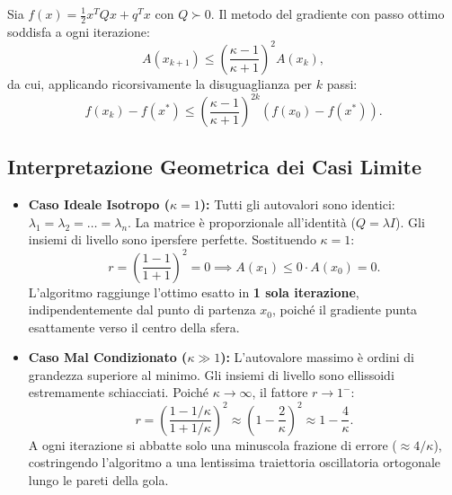 \begin{theorem}
Sia $f(x) = \frac{1}{2} x^T Q x + q^T x$ con $Q \succ 0$. Il metodo del gradiente con passo ottimo soddisfa a ogni iterazione:
\begin{equation}
    A(x_{k+1}) \le \left( \frac{\kappa - 1}{\kappa + 1} \right)^2 A(x_k),
\end{equation}
da cui, applicando ricorsivamente la disuguaglianza per $k$ passi:
\begin{equation}
    f(x_k) - f(x^*) \le \left( \frac{\kappa - 1}{\kappa + 1} \right)^{2k} (f(x_0) - f(x^*)).
\end{equation}
\end{theorem}

\subsection{Interpretazione Geometrica dei Casi Limite}
\begin{itemize}
    \item \textbf{Caso Ideale Isotropo ($\kappa = 1$):}
    Tutti gli autovalori sono identici: $\lambda_1 = \lambda_2 = \dots = \lambda_n$. La matrice \`e proporzionale all'identit\`a ($Q = \lambda I$). Gli insiemi di livello sono ipersfere perfette. Sostituendo $\kappa = 1$:
    \begin{equation}
        r = \left( \frac{1 - 1}{1 + 1} \right)^2 = 0 \implies A(x_1) \le 0 \cdot A(x_0) = 0.
    \end{equation}
    L'algoritmo raggiunge l'ottimo esatto in \textbf{1 sola iterazione}, indipendentemente dal punto di partenza $x_0$, poich\'e il gradiente punta esattamente verso il centro della sfera.
    \item \textbf{Caso Mal Condizionato ($\kappa \gg 1$):}
    L'autovalore massimo \`e ordini di grandezza superiore al minimo. Gli insiemi di livello sono ellissoidi estremamente schiacciati. Poich\'e $\kappa \to \infty$, il fattore $r \to 1^-$:
    \begin{equation}
        r = \left( \frac{1 - 1/\kappa}{1 + 1/\kappa} \right)^2 \approx \left( 1 - \frac{2}{\kappa} \right)^2 \approx 1 - \frac{4}{\kappa}.
    \end{equation}
    A ogni iterazione si abbatte solo una minuscola frazione di errore ($\approx 4/\kappa$), costringendo l'algoritmo a una lentissima traiettoria oscillatoria ortogonale lungo le pareti della gola.
\end{itemize}

